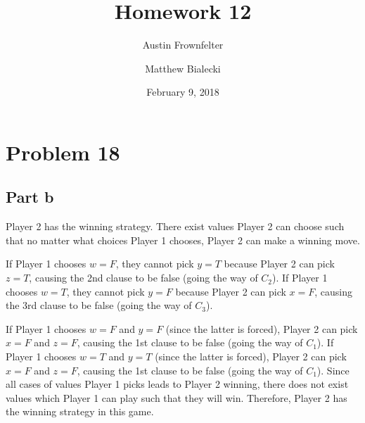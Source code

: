 \documentclass{article}
\title{Homework 12}
\author{Austin Frownfelter \and Matthew Bialecki}
\date{February 9, 2018}
\begin{document}
\maketitle

\section{Problem 18}
\subsection{Part b}
Player 2 has the winning strategy.  There exist values Player 2 can choose such that no matter what choices Player 1 chooses, Player 2 can make a winning move.

If Player 1 chooses $w=F$, they cannot pick $y=T$ because Player 2 can pick $z=T$, causing the 2nd clause to be false (going the way of $C_{2}$).  If Player 1 chooses $w=T$, they cannot pick $y=F$ because Player 2 can pick $x=F$, causing the 3rd clause to be false (going the way of $C_{3}$).

If Player 1 chooses $w=F$ and $y=F$ (since the latter is forced), Player 2 can pick $x=F$ and $z=F$, causing the 1st clause to be false (going the way of $C_{1}$).  If Player 1 chooses $w=T$ and $y=T$ (since the latter is forced), Player 2 can pick $x=F$ and $z=F$, causing the 1st clause to be false (going the way of $C_{1}$).  Since all cases of values Player 1 picks leads to Player 2 winning, there does not exist values which Player 1 can play such that they will win.  Therefore, Player 2 has the winning strategy in this game.
\end{document}
